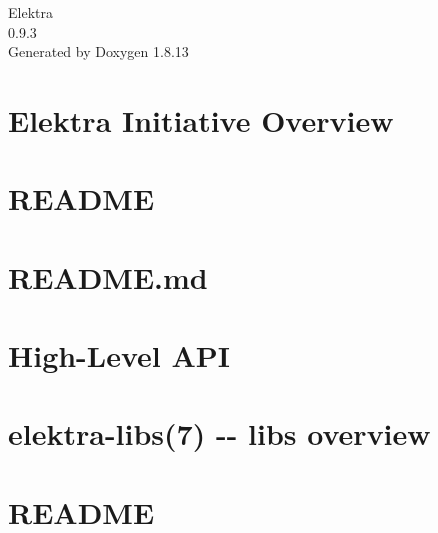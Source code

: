 \documentclass[twoside]{book}
\newcommand{\+}{\discretionary{\mbox{\scriptsize$\hookleftarrow$}}{}{}}
\newcommand{\clearemptydoublepage}{%
  \newpage{\pagestyle{empty}\cleardoublepage}%
}
\begin{document}
\hypersetup{pageanchor=false,
             bookmarksnumbered=true,
             pdfencoding=unicode
            }
\begin{titlepage}
\vspace*{7cm}
\begin{center}%
{\Large Elektra \\[1ex]\large 0.\+9.\+3 }\\
\vspace*{1cm}
{\large Generated by Doxygen 1.8.13}\\
\end{center}
\end{titlepage}
\clearemptydoublepage
{}
\tableofcontents
\clearemptydoublepage
{}
\hypersetup{pageanchor=true}

\chapter{Elektra Initiative Overview}
\label{index}\hypertarget{index}{}
\chapter{R\+E\+A\+D\+ME}
\label{md_src_libs_elektra_README}

\chapter{R\+E\+A\+D\+M\+E.\+md}
\label{src_libs_getenv_README_md}

\chapter{High-\/\+Level A\+PI}
\label{src_libs_highlevel_README_md}

\chapter{elektra-\/libs(7) -\/-\/ libs overview}
\label{src_libs_README_md}

\chapter{R\+E\+A\+D\+ME}
\label{md_src_bindings_io_doc_README}

\end{document}
